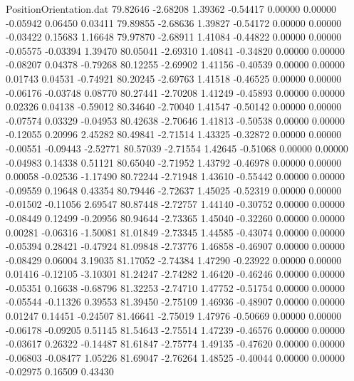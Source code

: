 \begin{filecontents}{PositionOrientation.dat}
  79.82646   -2.68208    1.39362    -0.54417    0.00000    0.00000   -0.05942    0.06450    0.03411
  79.89855   -2.68636    1.39827    -0.54172    0.00000    0.00000   -0.03422    0.15683    1.16648
  79.97870   -2.68911    1.41084    -0.44822    0.00000    0.00000   -0.05575   -0.03394    1.39470
  80.05041   -2.69310    1.40841    -0.34820    0.00000    0.00000   -0.08207    0.04378   -0.79268
  80.12255   -2.69902    1.41156    -0.40539    0.00000    0.00000    0.01743    0.04531   -0.74921
  80.20245   -2.69763    1.41518    -0.46525    0.00000    0.00000   -0.06176   -0.03748    0.08770
  80.27441   -2.70208    1.41249    -0.45893    0.00000    0.00000    0.02326    0.04138   -0.59012
  80.34640   -2.70040    1.41547    -0.50142    0.00000    0.00000   -0.07574    0.03329   -0.04953
  80.42638   -2.70646    1.41813    -0.50538    0.00000    0.00000   -0.12055    0.20996    2.45282
  80.49841   -2.71514    1.43325    -0.32872    0.00000    0.00000   -0.00551   -0.09443   -2.52771
  80.57039   -2.71554    1.42645    -0.51068    0.00000    0.00000   -0.04983    0.14338    0.51121
  80.65040   -2.71952    1.43792    -0.46978    0.00000    0.00000    0.00058   -0.02536   -1.17490
  80.72244   -2.71948    1.43610    -0.55442    0.00000    0.00000   -0.09559    0.19648    0.43354
  80.79446   -2.72637    1.45025    -0.52319    0.00000    0.00000   -0.01502   -0.11056    2.69547
  80.87448   -2.72757    1.44140    -0.30752    0.00000    0.00000   -0.08449    0.12499   -0.20956
  80.94644   -2.73365    1.45040    -0.32260    0.00000    0.00000    0.00281   -0.06316   -1.50081
  81.01849   -2.73345    1.44585    -0.43074    0.00000    0.00000   -0.05394    0.28421   -0.47924
  81.09848   -2.73776    1.46858    -0.46907    0.00000    0.00000   -0.08429    0.06004    3.19035
  81.17052   -2.74384    1.47290    -0.23922    0.00000    0.00000    0.01416   -0.12105   -3.10301
  81.24247   -2.74282    1.46420    -0.46246    0.00000    0.00000   -0.05351    0.16638   -0.68796
  81.32253   -2.74710    1.47752    -0.51754    0.00000    0.00000   -0.05544   -0.11326    0.39553
  81.39450   -2.75109    1.46936    -0.48907    0.00000    0.00000    0.01247    0.14451   -0.24507
  81.46641   -2.75019    1.47976    -0.50669    0.00000    0.00000   -0.06178   -0.09205    0.51145
  81.54643   -2.75514    1.47239    -0.46576    0.00000    0.00000   -0.03617    0.26322   -0.14487
  81.61847   -2.75774    1.49135    -0.47620    0.00000    0.00000   -0.06803   -0.08477    1.05226
  81.69047   -2.76264    1.48525    -0.40044    0.00000    0.00000   -0.02975    0.16509    0.43430

\end{filecontents}
